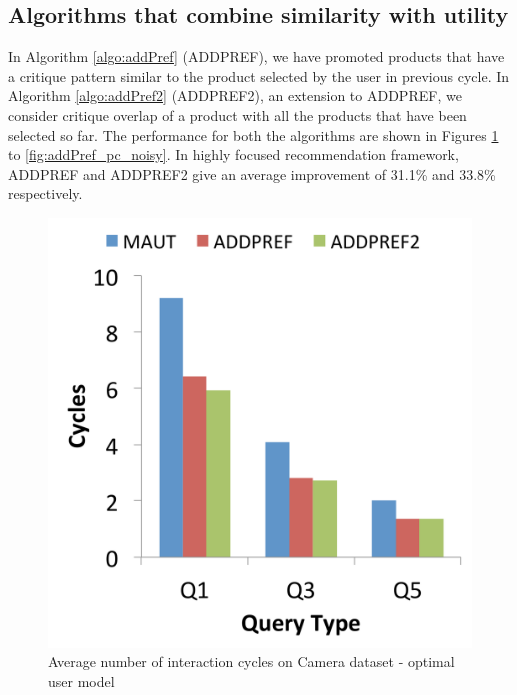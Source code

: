 \subsection{Algorithms that combine similarity with utility}
In Algorithm \ref{algo:addPref} (ADDPREF), we have promoted products that have a critique pattern similar to the product selected by the user in previous cycle.
In Algorithm \ref{algo:addPref2} (ADDPREF2), an extension to ADDPREF, we consider critique overlap of a product with all the products that have been selected so far.
The performance for both the algorithms are shown in Figures \ref{fig:addPref_camera_opt} to \ref{fig:addPref_pc_noisy}.
In highly focused recommendation framework, ADDPREF and ADDPREF2 give an average improvement of 31.1\% and 33.8\% respectively.

\begin{figure}[h]
\centering
\begin{minipage}{.45\textwidth}
  \centering
  \includegraphics[width=1\linewidth]{figures-bharath/addPref_camera_opt}
  \caption[]{Average number of interaction cycles on Camera dataset - optimal user model}
  \label{fig:addPref_camera_opt}
\end{minipage}%
\;\;\;\;\;\;
\begin{minipage}{.45\textwidth}
  \centering

\end{minipage}
\end{figure}
